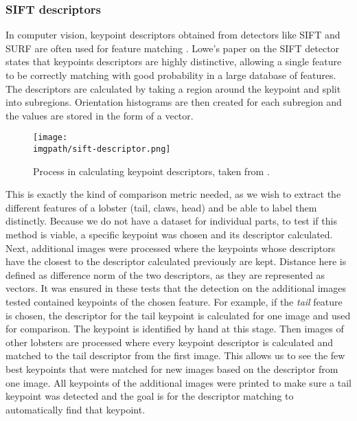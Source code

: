 \subsubsection{SIFT descriptors}
In computer vision, keypoint descriptors obtained from detectors like SIFT and SURF are often used for feature matching \cite{cv-matching}. Lowe's paper \cite{sift} on the SIFT detector states that keypoints descriptors are highly distinctive, allowing a single feature to be correctly matching with good probability in a large database of features. The descriptors are calculated by taking a region around the keypoint and split into subregions. Orientation histograms are then created for each subregion and the values are stored in the form of a vector.
\begin{figure}[H]
\texttt{[image: \\imgpath/sift-descriptor.png]}
\caption{Process in calculating keypoint descriptors, taken from \cite{fish-classification}.}
\end{figure}
\noindent
This is exactly the kind of comparison metric needed, as we wish to extract the different features of a lobster (tail, claws, head) and be able to label them distinctly. Because we do not have a dataset for individual parts, to test if this method is viable, a specific keypoint was chosen and its descriptor calculated. Next, additional images were processed where the keypoints whose descriptors have the closest to the descriptor calculated previously are kept. Distance here is defined as difference norm of the two descriptors, as they are represented as vectors. It was ensured in these tests that the detection on the additional images tested contained keypoints of the chosen feature. For example, if the \textit{tail} feature is chosen, the descriptor for the tail keypoint is calculated for one image and used for comparison. The keypoint is identified by hand at this stage. Then images of other lobsters are processed where every keypoint descriptor is calculated and matched to the tail descriptor from the first image. This allows us to see the few best keypoints that were matched for new images based on the descriptor from one image. All keypoints of the additional images were printed to make sure a tail keypoint was detected and the goal is for the descriptor matching to automatically find that keypoint.


